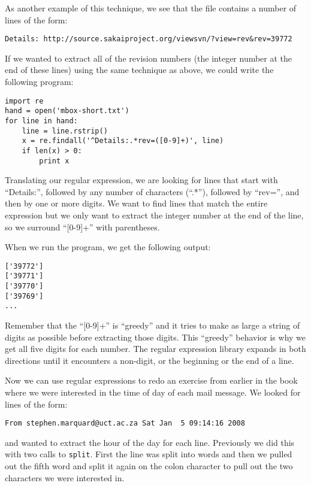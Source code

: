 As another example of this technique, we see that the file contains a number of lines
of the form:

\beforeverb
\begin{verbatim}
Details: http://source.sakaiproject.org/viewsvn/?view=rev&rev=39772
\end{verbatim}
\afterverb
%
If we wanted to extract all of the revision numbers (the integer number at the end of these lines)
using the same technique as above, we could write the following program:

\beforeverb
\begin{verbatim}
import re
hand = open('mbox-short.txt')
for line in hand:
    line = line.rstrip()
    x = re.findall('^Details:.*rev=([0-9]+)', line)
    if len(x) > 0:
        print x
\end{verbatim}
\afterverb
%
Translating our regular expression, we are looking for lines that start with ``Details:'',
followed by any number of characters (``.*''), followed by ``rev='', and then by one or
more digits.   We want to find lines that match the entire expression but we only want to
extract the integer number at the end of the line, so we surround ``[0-9]+'' with parentheses.

When we run the program, we get the following output:

\beforeverb
\begin{verbatim}
['39772']
['39771']
['39770']
['39769']
...
\end{verbatim}
\afterverb
%
Remember that the ``[0-9]+'' is ``greedy'' and it tries to make as large a string of digits as
possible before extracting those digits.  This ``greedy'' behavior is why we get all five digits
for each number.  The regular expression library expands in both directions until it encounters a
non-digit, or the beginning or the end of a line.

Now we can use regular expressions to redo an exercise from earlier in the book where we were
interested in the time of day of each mail message.   We looked for lines of the form:

\beforeverb
\begin{verbatim}
From stephen.marquard@uct.ac.za Sat Jan  5 09:14:16 2008
\end{verbatim}
\afterverb
%
and wanted to extract the hour of the day for each line.  Previously we did this with two calls
to {\tt split}.  First the line was split into words and then we pulled out the fifth word and split
it again on the colon character to pull out the two characters we were interested in.


